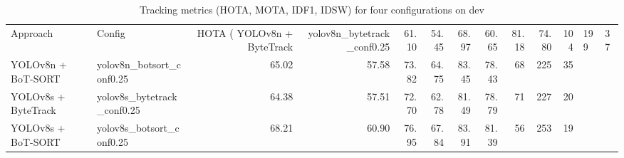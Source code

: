 \begin{table}
\caption{Tracking metrics (HOTA, MOTA, IDF1, IDSW) for four configurations on dev}
\label{tab:tracking_metrics_dev}
\begin{tabular}{llrrrrrrrrr}
\toprule
Approach & Config & HOTA (%
\midrule
YOLOv8n + ByteTrack & yolov8n_bytetrack_conf0.25 & 61.10 & 54.45 & 68.97 & 60.65 & 81.18 & 74.80 & 104 & 199 & 37 \\
YOLOv8n + BoT-SORT & yolov8n_botsort_conf0.25 & 65.02 & 57.58 & 73.82 & 64.75 & 83.45 & 78.43 & 68 & 225 & 35 \\
YOLOv8s + ByteTrack & yolov8s_bytetrack_conf0.25 & 64.38 & 57.51 & 72.70 & 62.78 & 81.49 & 78.79 & 71 & 227 & 20 \\
YOLOv8s + BoT-SORT & yolov8s_botsort_conf0.25 & 68.21 & 60.90 & 76.95 & 67.84 & 83.91 & 81.39 & 56 & 253 & 19 \\
\bottomrule
\end{tabular}
\end{table}
